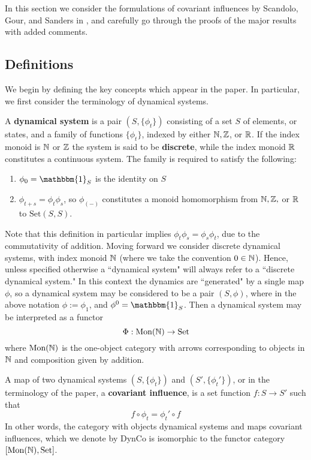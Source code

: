 In this section we consider the formulations of covariant influences by Scandolo, Gour, and Sanders in \cite{ScandGourSanders}, and carefully go through the proofs of the major results with added comments.


\subsection{Definitions}

We begin by defining the key concepts which appear in the paper. In particular, we first consider the terminology of dynamical systems.

\begin{defn}[label=defn:dynSyst]
    A \textbf{dynamical system} is a pair $(S,\{\phi_t\})$ consisting of a set $S$ of elements, or states, and a family of functions $\{\phi_t\}$, indexed by either $\mathbb N, \mathbb Z$, or $\mathbb R$. If the index monoid is $\mathbb N$ or $\mathbb Z$ the system is said to be \textbf{discrete}, while the index monoid $\mathbb R$ constitutes a continuous system. The family is required to satisfy the following: 
    \begin{enumerate}
        \item $\phi_0 = \mathbbm{1}_S$ is the identity on $S$
        \item $\phi_{t+s} = \phi_t\phi_s$, so $\phi_{(-)}$ constitutes a monoid homomorphism from $\mathbb N,\mathbb Z,$ or $\mathbb R$ to $\text{Set}(S,S)$. 
    \end{enumerate}
\end{defn}

Note that this definition in particular implies $\phi_t\phi_s = \phi_s\phi_t$, due to the commutativity of addition. Moving forward we consider discrete dynamical systems, with index monoid $\mathbb N$ (where we take the convention $0 \in \mathbb N$). Hence, unless specified otherwise a ``dynamical system" will always refer to a ``discrete dynamical system." In this context the dynamics are ``generated" by a single map $\phi$, so a dynamical system may be considered to be a pair $(S,\phi)$, where in the above notation $\phi := \phi_1$, and $\phi^0 = \mathbbm{1}_S$. Then a dynamical system may be interpreted as a functor $$\Phi:\text{Mon}(\mathbb N)\rightarrow \text{Set}$$
where $\text{Mon}(\mathbb N)$ is the one-object category with arrows corresponding to objects in $\mathbb N$ and composition given by addition. 


A map of two dynamical systems $(S,\{\phi_t\})$ and $(S',\{\phi_t'\})$, or in the terminology of the paper, a \textbf{covariant influence}, is a set function $f:S\rightarrow S'$ such that 
\begin{equation}\label{eq:covariance}
    f\circ \phi_t = \phi_t'\circ f
\end{equation}
In other words, the category with objects dynamical systems and maps covariant influences, which we denote by $\text{DynCo}$ is isomorphic to the functor category $[\text{Mon}(\mathbb N),\text{Set}]$.


